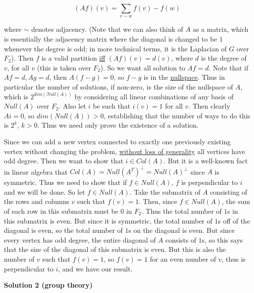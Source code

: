 \begin{enumerate}
 
 \[(Af)(v) = \sum_{v \sim w} f(v) - f(w)\]

 where $\sim$ denotes adjacency. (Note that we can also think of $A$ as a matrix, which is essentially the adjacency matrix where the diagonal is changed to be $1$ whenever the degree is odd; in more technical terms, it is the Laplacian of $G$ over $F_2$). Then $f$ is a valid partition \href{https://artofproblemsolving.com/wiki/index.php?title=Iff}{iff} $(Af)(v) = d(v)$, where $d$ is the degree of $v$, for all $v$ (this is taken over $F_2$). So we want all solution to $Af = d$. Note that if $Af = d, Ag = d$, then $A(f - g) = 0$, so $f - g$ is in the \href{https://artofproblemsolving.com/wiki/index.php?title=Nullspace&action=edit&redlink=1}{nullspace}. Thus in particular the number of solutions, if non-zero, is the size of the nullspace of $A$, which is $2^{dim(Null(A))}$ by considering all linear combinations of any basis of $Null(A)$ over $F_2$. Also let $i$ be such that $i(v) = 1$ for all $v$. Then clearly $Ai = 0$, so $dim(Null(A)) > 0$, establishing that the number of ways to do this is $2^k$, $k > 0$. Thus we need only prove the existence of a solution.

 Since we can add a new vertex connected to exactly one previously existing vertex without changing the problem, \href{https://artofproblemsolving.com/wiki/index.php?title=Without\_loss\_of\_generality}{without loss of generality} all vertices have odd degree. Then we want to show that $i \in Col(A)$. But it is a well-known fact in linear algebra that $Col(A) = Null(A^T)^{\perp} = Null(A)^{\perp}$ since $A$ is symmetric. Thus we need to show that if $f \in Null(A)$, $f$ is perpendicular to $i$ and we will be done. So let $f \in Null(A)$. Take the submatrix of $A$ consisting of the rows and columns $v$ such that $f(v) = 1$. Then, since $f \in Null(A)$, the sum of each row in this submatrix must be $0$ in $F_2$. Thus the total number of $1$s in this submatrix is even. But since it is symmetric, the total number of $1$s off of the diagonal is even, so the total number of $1$s on the diagonal is even. But since every vertex has odd degree, the entire diagonal of $A$ consists of $1$s, so this says that the size of the diagonal of this submatrix is even. But this is also the number of $v$ such that $f(v) = 1$, so $f(v) = 1$ for an even number of $v$, thus is perpendicular to $i$, and we have our result.

 



\textbf{Solution 2 (group theory)}


\end{enumerate}
